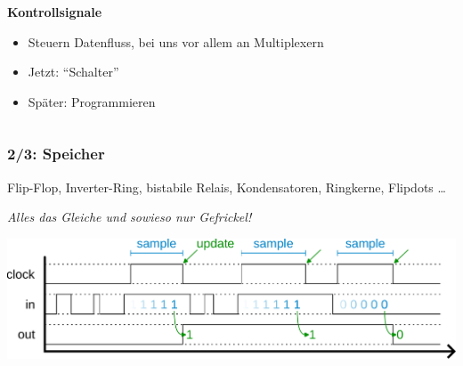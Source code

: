\documentclass[t,aspectratio=169,usenames,dvipsnames]{beamer}
\begin{document}
\begin{frame}
\begin{columns}[T]
\begin{column}{.45\textwidth}
      \bigskip

      \textbf{Kontrollsignale}

      \begin{itemize}
      \item Steuern Datenfluss, bei uns vor allem an Multiplexern
      \item Jetzt: \enquote{Schalter}
      \item Später: Programmieren
      \end{itemize}

      \bigskip

  \end{column}
  \end{columns}
\end{frame}

\begin{frame}
  \frametitle{2/3: Speicher}

  \begin{center}
    Flip-Flop, Inverter-Ring, bistabile Relais, Kondensatoren, Ringkerne, Flipdots \ldots

    \textit{Alles das Gleiche und sowieso nur Gefrickel!}
  \end{center}

  \bigskip

  \includegraphics[width=\linewidth]{reg-waveform.pdf}
\end{frame}
\end{document}
